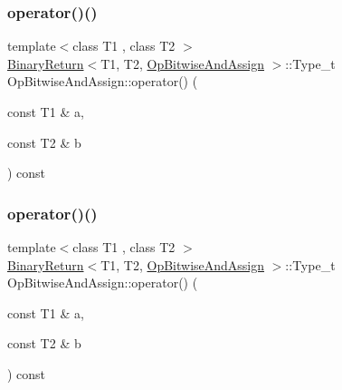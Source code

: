 \subsubsection{\texorpdfstring{operator()()}{operator()()}\hspace{0.1cm}{\footnotesize\ttfamily [1/3]}}
{\footnotesize\ttfamily template$<$class T1 , class T2 $>$ \\
\mbox{\hyperlink{structBinaryReturn}{Binary\+Return}}$<$T1, T2, \mbox{\hyperlink{structOpBitwiseAndAssign}{Op\+Bitwise\+And\+Assign}} $>$\+::Type\+\_\+t Op\+Bitwise\+And\+Assign\+::operator() (\begin{DoxyParamCaption}\item[{const T1 \&}]{a,  }\item[{const T2 \&}]{b }\end{DoxyParamCaption}) const\hspace{0.3cm}{\ttfamily [inline]}}

\mbox{\label{structOpBitwiseAndAssign_a0ff733a94050f1eb8c0e52a8b1b27c01}} 
\subsubsection{\texorpdfstring{operator()()}{operator()()}\hspace{0.1cm}{\footnotesize\ttfamily [2/3]}}
{\footnotesize\ttfamily template$<$class T1 , class T2 $>$ \\
\mbox{\hyperlink{structBinaryReturn}{Binary\+Return}}$<$T1, T2, \mbox{\hyperlink{structOpBitwiseAndAssign}{Op\+Bitwise\+And\+Assign}} $>$\+::Type\+\_\+t Op\+Bitwise\+And\+Assign\+::operator() (\begin{DoxyParamCaption}\item[{const T1 \&}]{a,  }\item[{const T2 \&}]{b }\end{DoxyParamCaption}) const\hspace{0.3cm}{\ttfamily [inline]}}

\mbox{\label{structOpBitwiseAndAssign_a0ff733a94050f1eb8c0e52a8b1b27c01}} 
